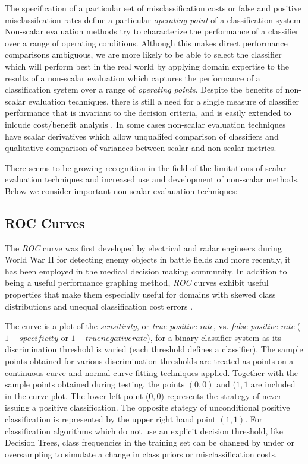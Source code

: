 \documentclass[12pt]{unbthesis}
\begin{document}
The specification of a particular set of
misclassification costs or false and positive misclassifcation rates
define a particular \textit{operating point} of a classification system
Non-scalar evaluation methods try to characterize the performance of a
classifier over a range of operating conditions. Although this makes
direct performance comparisons ambiguous, we are more likely to be
able to select the classifier which will perform best in the real
world by applying domain expertise to the results of a non-scalar
evaluation which captures the performance of a classification system over a range
of \textit{operating points}. Despite the benefits of non-scalar
evaluation techniques, there is still a need for a single measure of
classifier performance that is invariant to the decision criteria, and
is easily extended to inlcude cost/benefit analysis
\cite{Refworks:32}. In some cases non-scalar evaluation techniques
have scalar derivatives which allow unqualifed comparison of
classifiers and qualitative comparison of variances between scalar and
non-scalar metrics.

There seems to be growing recognition in the field of the limitations
of scalar evaluation techniques and increased use and development of
non-scalar methods. Below we consider important non-scalar evalauation
techniques:

\subsection{ROC Curves}
The \textit{ROC} curve was first developed by electrical and radar
engineers during World War II for detecting enemy objects in battle
fields and more recently, it has been employed in the medical decision
making community. In addition to being a useful performance graphing
method, \textit{ROC} curves exhibit useful properties that make them
especially useful for domains with skewed class distributions and
unequal classification cost errors \cite{Refworks:39}.

The curve is a plot of the \textit{sensitivity}, or \textit{true
  positive rate}, vs. \textit{false positive rate} (\(1 −
specificity\) or \(1 - true negative rate\)), for a binary classifier
system as its discrimination threshold is varied (each threshold
defines a classifier). The sample points obtained for various
discrimination thresholds are treated as points on a continuous curve
and normal curve fitting techniques applied. Together with the sample
points obtained during testing, the points \((0,0)\) and \((1,1\) are
included in the curve plot. The lower left point (\(0,0)\) represents
the strategy of never issuing a positive classification. The opposite
stategy of unconditional positive classification is represented by the
upper right hand point \((1,1)\). For classification algorithms which
do not use an explicit decision threshold, like Decision Trees, class
frequencies in the training set can be changed by under or
oversampling to simulate a change in class priors or misclassification
costs. 
\end{document}
